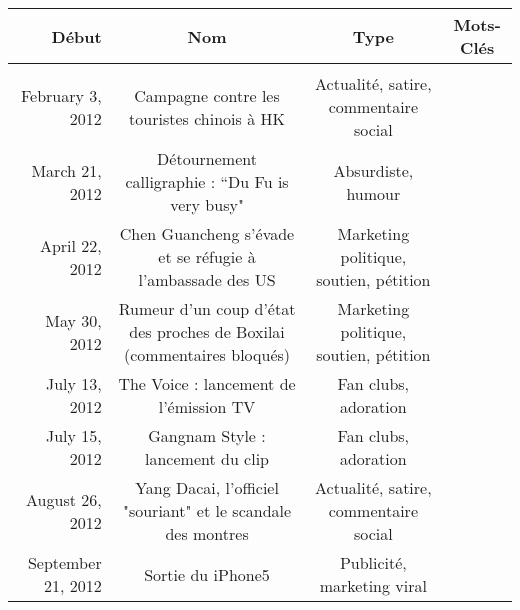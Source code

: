 

\begin{landscape}
    \begin{table}
        \begin{tabulary}{\linewidth}{ r| C C C}

            \textbf{Début} & 
            \textbf{Nom} &  
            \textbf{Type} &  
            \textbf{Mots-Clés} \\

            \hline \\[-1.2ex]
            February 3, 2012 & 
            Campagne contre les touristes chinois à HK & 
            Actualité, satire, commentaire social &
             \\

            March 21, 2012 &
            Détournement calligraphie : “Du Fu is very busy" &
            Absurdiste, humour &
             \\

            April 22, 2012 &
            Chen Guancheng s'évade et se réfugie à l'ambassade des US &
            Marketing politique, soutien, pétition &
             \\

            May 30, 2012 & 
            Rumeur d'un coup d'état des proches de Boxilai (commentaires bloqués) &
            Marketing politique, soutien, pétition & 
             \\

            July 13, 2012 &  
            The Voice : lancement de l'émission TV &
             Fan clubs, adoration & 
             \\

            July 15, 2012 &  
            Gangnam Style : lancement du clip &  
            Fan clubs, adoration  &  
             \\

            August 26, 2012 &
            Yang Dacai, l'officiel "souriant" et le scandale des montres &   
            Actualité, satire, commentaire social &  
             \\

            September 21, 2012 & 
            Sortie du iPhone5   &
            Publicité, marketing viral & 
             \\


\end{tabulary}
\end{table}
\end{landscape}
